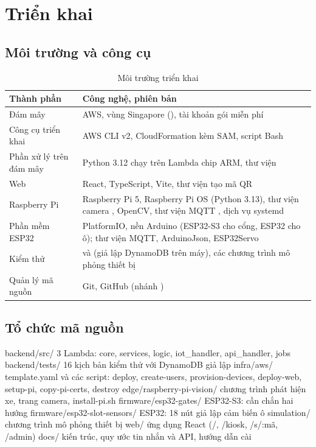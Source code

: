 \chapter{Triển khai}

\section{Môi trường và công cụ}

\begin{table}[H]
\centering
\caption{Môi trường triển khai}
\label{tab:moitruong}
\begin{tabularx}{\textwidth}{@{}P{3.5cm}L@{}}
\toprule
\textbf{Thành phần} & \textbf{Công nghệ, phiên bản} \\ \midrule
Đám mây & AWS, vùng Singapore (), tài khoản gói miễn phí \\
Công cụ triển khai & AWS CLI v2, CloudFormation kèm SAM, script Bash \\
Phần xử lý trên đám mây & Python 3.12 chạy trên Lambda chip ARM, thư viện  \\
Web & React, TypeScript, Vite, thư viện tạo mã QR \\
Raspberry Pi & Raspberry Pi 5, Raspberry Pi OS (Python 3.13), thư viện camera , OpenCV, thư viện MQTT , dịch vụ systemd \\
Phần mềm ESP32 & PlatformIO, nền Arduino (ESP32-S3 cho cổng, ESP32 cho ô); thư viện MQTT, ArduinoJson, ESP32Servo \\
Kiểm thử &  và  (giả lập DynamoDB trên máy), các chương trình mô phỏng thiết bị \\
Quản lý mã nguồn & Git, GitHub (nhánh ) \\
\bottomrule
\end{tabularx}
\end{table}

\section{Tổ chức mã nguồn}

\begin{lenh}
backend/src/        3 Lambda: core, services, logic, iot_handler,
                    api_handler, jobs
backend/tests/      16 kịch bản kiểm thử với DynamoDB giả lập
infra/aws/          template.yaml và các script: deploy, create-users,
                    provision-devices, deploy-web, setup-pi,
                    copy-pi-certs, destroy
edge/raspberry-pi-vision/   chương trình phát hiện xe, trang camera,
                            install-pi.sh
firmware/esp32-gates/       ESP32-S3: cần chắn hai hướng
firmware/esp32-slot-sensors/ ESP32: 18 nút giả lập cảm biến ô
simulation/         chương trình mô phỏng thiết bị
web/                ứng dụng React (/, /kiosk, /s/:mã, /admin)
docs/               kiến trúc, quy ước tin nhắn và API, hướng dẫn cài
\end{lenh}

